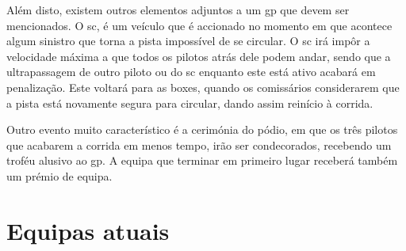\documentclass{report}
\begin{document}
Além disto, existem outros elementos adjuntos a um \ac{gp} que devem ser mencionados. O \ac{sc}, é um veículo que é accionado no momento em que acontece algum sinistro que torna a pista impossível de se circular. O \ac{sc} irá impôr a velocidade máxima a que todos os pilotos atrás dele podem andar, sendo que a ultrapassagem de outro piloto ou do \ac{sc} enquanto este está ativo acabará em penalização. Este voltará para as boxes, quando os comissários considerarem que a pista está novamente segura para circular, dando assim reinício à corrida.

Outro evento muito característico é a cerimónia do pódio, em que os três pilotos que acabarem a corrida em menos tempo, irão ser condecorados, recebendo um troféu alusivo ao \ac{gp}. A equipa que terminar em primeiro lugar receberá também um prémio de equipa.
\section{Equipas atuais}
\end{document}
